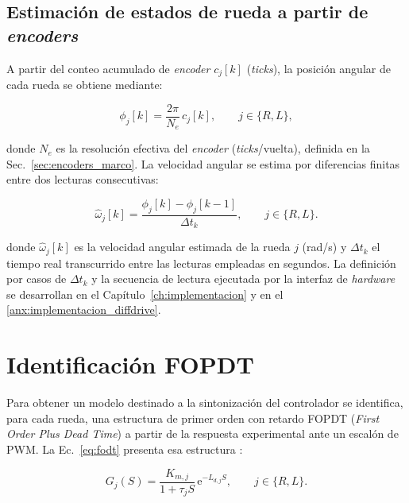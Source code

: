 \subsection{Estimación de estados de rueda a partir de \texorpdfstring{\textit{encoders}}{encoders}}
\label{sec:estados_rueda}

A partir del conteo acumulado de \textit{encoder} $c_j[k]$ (\textit{ticks}), la posición
angular de cada rueda se obtiene mediante:

\begin{equation}
\phi_j[k]
=
\frac{2\pi}{N_e}\,c_j[k],
\qquad j\in\{R,L\},
\label{eq:posicion_rueda_encoder}
\end{equation}

\noindent donde $N_e$ es la resolución efectiva del \textit{encoder} (\textit{ticks}/vuelta),
definida en la Sec.~\ref{sec:encoders_marco}. La velocidad angular se estima por diferencias finitas entre dos lecturas
consecutivas:

\begin{equation}
\widehat{\omega}_j[k]
=
\frac{\phi_j[k]-\phi_j[k-1]}{\Delta t_k},
\qquad j\in\{R,L\}.
\label{eq:w_ruedas}
\end{equation}

\noindent donde $\widehat{\omega}_j[k]$ es la velocidad angular estimada de
la rueda $j$ (rad/s) y $\Delta t_k$ el tiempo real transcurrido entre las
lecturas empleadas en segundos. La definición por casos de $\Delta t_k$ y la
secuencia de lectura ejecutada por la interfaz de \textit{hardware} se desarrollan en
el Capítulo~\ref{ch:implementacion} y en el
\ref{anx:implementacion_diffdrive}.

\section{Identificación FOPDT}
\label{sec:fodt}

Para obtener un modelo destinado a la sintonización del controlador se
identifica, para cada rueda, una estructura de primer orden con retardo FOPDT
(\textit{First Order Plus Dead Time}) a partir de la respuesta experimental
ante un escalón de \gls{PWM}. La Ec.~\eqref{eq:fodt} presenta esa estructura
\citep{maxim2023fopdt}:

\begin{equation}
G_j(S)
=
\frac{K_{m,j}}{1+\tau_j S}\,
\mathrm{e}^{-L_{d,j}S},
\qquad j\in\{R,L\}.
\label{eq:fodt}
\end{equation}

